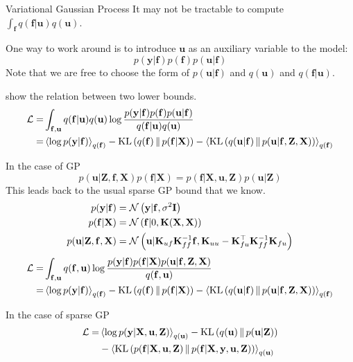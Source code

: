\documentclass[14pt,aspectratio=1610]{beamer}
\newcommand{\yV}{\mathbf{y}}
\newcommand{\fV}{\mathbf{f}}
\newcommand{\xM}{\mathbf{X}}
\newcommand{\K}{\mathbf{K}}
\newcommand{\uV}{\mathbf{u}}
\newcommand{\zM}{\mathbf{Z}}
\newcommand{\bound}{\mathcal{L}}
\newcommand{\I}{\mathbf{I}}
\begin{document}
\begin{frame}{Variational Gaussian Process}
It may not be tractable to compute $ \int_{\fV} q(\fV|\uV) q(\uV)$.

One way to work around is to introduce $\uV$ as an auxiliary variable to the model:
\[
p(\yV | \fV) p(\fV) p(\uV|\fV)
\]
Note that we are free to choose the form of $p(\uV|\fV)$ and $q(\uV)$ and $q(\fV|\uV)$.
\end{frame}

\begin{frame}{}
show the relation between two lower bounds.
\begin{align*}
\bound =& \int_{\fV, \uV}q(\fV|\uV) q(\uV) \log \frac{p(\yV | \fV) p(\fV) p(\uV|\fV) }{q(\fV|\uV) q(\uV)} \\
=& \expectation{\log p(\yV | \fV)}_{q(\fV)} - \KL{q(\fV)}{p(\fV|\xM)} - \expectation{\KL{q(\uV|\fV)}{p(\uV| \fV, \zM, \xM)}}_{q(\fV)}
\end{align*}
\end{frame}


\begin{frame}{In the case of GP}
\[
p(\uV|\zM, \fV, \xM) p(\fV| \xM) = p(\fV|\xM, \uV, \zM) p(\uV| \zM)
\]
This leads back to the usual sparse GP bound that we know.
\begin{align*}
p(\yV| \fV) &= \gaussianDist{\yV}{\fV}{\sigma^2 \I} \\ 
p (\fV| \xM) &= \gaussianDist{\fV}{0}{\K(\xM, \xM)} \\
p(\uV| \zM, \fV, \xM) &= \gaussianDist{\uV}{\K_{uf} \K_{ff}^{-1}\fV}{\K_{uu} - \K_{fu}^\top \K_{ff}^{-1} \K_{fu}}
\end{align*}
\begin{align*}
\bound =& \int_{\fV, \uV} q(\fV, \uV) \log \frac{p(\yV | \fV) p(\fV | \xM) p(\uV| \fV, \zM, \xM) }{q(\fV, \uV)} \\
=& \expectation{\log p(\yV | \fV)}_{q(\fV)} - \KL{q(\fV)}{p(\fV|\xM)} - \expectation{\KL{q(\uV|\fV)}{p(\uV| \fV, \zM, \xM)}}_{q(\fV)}
\end{align*}

\end{frame}

\begin{frame}{In the case of sparse GP}
\begin{align*}
\bound =& \expectation{\log p(\yV | \xM, \uV, \zM)}_{q(\uV)} - \KL{q(\uV)}{p(\uV| \zM)} \\
& - \expectation{\KL{p(\fV|\xM, \uV, \zM)}{p(\fV|\xM, \yV, \uV, \zM)}}_{q(\uV)}
\end{align*}
\end{frame}
\end{document}
